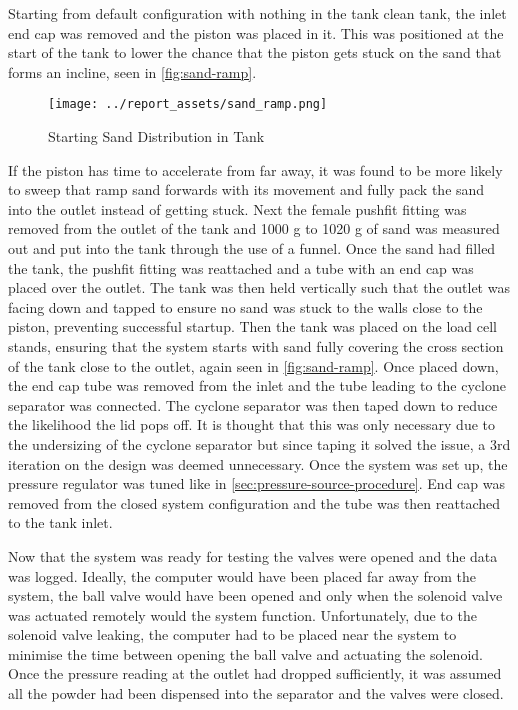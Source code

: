 Starting from default configuration with nothing in the tank clean tank, the inlet end cap was removed and the piston was placed in it. This was positioned at the start of the tank to lower the chance that the piston gets stuck on the sand that forms an incline, seen in \autoref{fig:sand-ramp}.
\begin{figure}[htbp]
    \centering
    
    \begin{minipage}{0.60\textwidth}
        \centering
        \texttt{[image: ../report\_assets/sand\_ramp.png]}
        \caption{Starting Sand Distribution in Tank}\label{fig:sand-ramp}
    \end{minipage}

\end{figure}
If the piston has time to accelerate from far away, it was found to be more likely to sweep that ramp sand forwards with its movement and fully pack the sand into the outlet instead of getting stuck. Next the female pushfit fitting was removed from the outlet of the tank and 1000 g to 1020 g of sand was measured out and put into the tank through the use of a funnel. Once the sand had filled the tank, the pushfit fitting was reattached and a tube with an end cap was placed over the outlet. The tank was then held vertically such that the outlet was facing down and tapped to ensure no sand was stuck to the walls close to the piston, preventing successful startup. Then the tank was placed on the load cell stands, ensuring that the system starts with sand fully covering the cross section of the tank close to the outlet, again seen in \autoref{fig:sand-ramp}. Once placed down, the end cap tube was removed from the inlet and the tube leading to the cyclone separator was connected. The cyclone separator was then taped down to reduce the likelihood the lid pops off. It is thought that this was only necessary due to the undersizing of the cyclone separator but since taping it solved the issue, a 3rd iteration on the design was deemed unnecessary. Once the system was set up, the pressure regulator was tuned like in \autoref{sec:pressure-source-procedure}. End cap was removed from the closed system configuration and the tube was then reattached to the tank inlet.

Now that the system was ready for testing the valves were opened and the data was logged. Ideally, the computer would have been placed far away from the system, the ball valve would have been opened and only when the solenoid valve was actuated remotely would the system function. Unfortunately, due to the solenoid valve leaking, the computer had to be placed near the system to minimise the time between opening the ball valve and actuating the solenoid. Once the pressure reading at the outlet had dropped sufficiently, it was assumed all the powder had been dispensed into the separator and the valves were closed.

